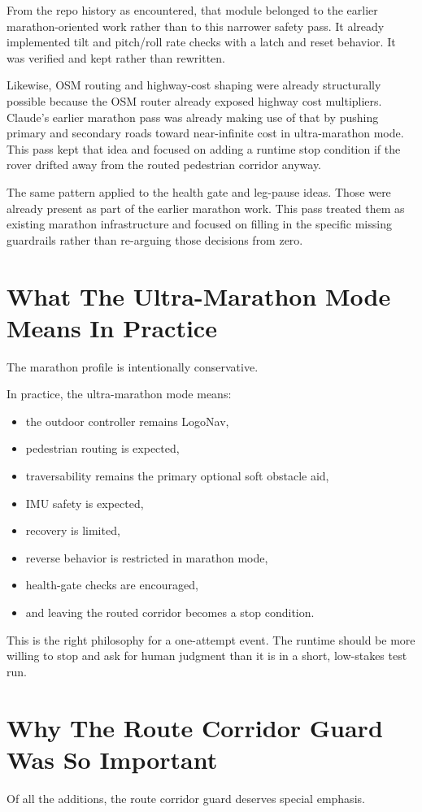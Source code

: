 \documentclass[11pt]{article}
\begin{document}
From the repo history as encountered, that module belonged to the earlier marathon-oriented work rather than to this narrower safety pass. It already implemented tilt and pitch/roll rate checks with a latch and reset behavior. It was verified and kept rather than rewritten.

Likewise, OSM routing and highway-cost shaping were already structurally possible because the OSM router already exposed highway cost multipliers. Claude's earlier marathon pass was already making use of that by pushing primary and secondary roads toward near-infinite cost in ultra-marathon mode. This pass kept that idea and focused on adding a runtime stop condition if the rover drifted away from the routed pedestrian corridor anyway.

The same pattern applied to the health gate and leg-pause ideas. Those were already present as part of the earlier marathon work. This pass treated them as existing marathon infrastructure and focused on filling in the specific missing guardrails rather than re-arguing those decisions from zero.

\section{What The Ultra-Marathon Mode Means In Practice}
The marathon profile is intentionally conservative.

In practice, the ultra-marathon mode means:
\begin{itemize}[leftmargin=*]
\item the outdoor controller remains LogoNav,
\item pedestrian routing is expected,
\item traversability remains the primary optional soft obstacle aid,
\item IMU safety is expected,
\item recovery is limited,
\item reverse behavior is restricted in marathon mode,
\item health-gate checks are encouraged,
\item and leaving the routed corridor becomes a stop condition.
\end{itemize}

This is the right philosophy for a one-attempt event. The runtime should be more willing to stop and ask for human judgment than it is in a short, low-stakes test run.

\section{Why The Route Corridor Guard Was So Important}
Of all the additions, the route corridor guard deserves special emphasis.
\end{document}
